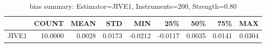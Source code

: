 \begin{table}[ht]
\centering
\caption{bias summary: Estimator=JIVE1, Instruments=200, Strength=0.80}
\begin{tabular}{lrrrrrrrr}
\toprule
 & COUNT & MEAN & STD & MIN & 25\% & 50\% & 75\% & MAX \\
\midrule
JIVE1 & 10.0000 & 0.0028 & 0.0173 & -0.0212 & -0.0117 & 0.0035 & 0.0141 & 0.0304 \\
\bottomrule
\end{tabular}
\end{table}
